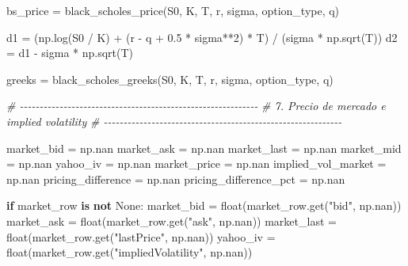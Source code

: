 \documentclass[
  11pt,
]{article}
\newenvironment{Shaded}{}{}
\newcommand{\BuiltInTok}[1]{\textcolor[rgb]{0.00,0.50,0.00}{#1}}
\newcommand{\CommentTok}[1]{\textcolor[rgb]{0.38,0.63,0.69}{\textit{#1}}}
\newcommand{\ControlFlowTok}[1]{\textcolor[rgb]{0.00,0.44,0.13}{\textbf{#1}}}
\newcommand{\DecValTok}[1]{\textcolor[rgb]{0.25,0.63,0.44}{#1}}
\newcommand{\FloatTok}[1]{\textcolor[rgb]{0.25,0.63,0.44}{#1}}
\newcommand{\KeywordTok}[1]{\textcolor[rgb]{0.00,0.44,0.13}{\textbf{#1}}}
\newcommand{\NormalTok}[1]{#1}
\newcommand{\OperatorTok}[1]{\textcolor[rgb]{0.40,0.40,0.40}{#1}}
\newcommand{\StringTok}[1]{\textcolor[rgb]{0.25,0.44,0.63}{#1}}
\newcommand{\VariableTok}[1]{\textcolor[rgb]{0.10,0.09,0.49}{#1}}
\begin{document}
\begin{Shaded}
\begin{Highlighting}[]
\NormalTok{bs\_price }\OperatorTok{=}\NormalTok{ black\_scholes\_price(S0, K, T, r, sigma, option\_type, q)}

\NormalTok{d1 }\OperatorTok{=}\NormalTok{ (np.log(S0 }\OperatorTok{/}\NormalTok{ K) }\OperatorTok{+}\NormalTok{ (r }\OperatorTok{{-}}\NormalTok{ q }\OperatorTok{+} \FloatTok{0.5} \OperatorTok{*}\NormalTok{ sigma}\OperatorTok{**}\DecValTok{2}\NormalTok{) }\OperatorTok{*}\NormalTok{ T) }\OperatorTok{/}\NormalTok{ (sigma }\OperatorTok{*}\NormalTok{ np.sqrt(T))}
\NormalTok{d2 }\OperatorTok{=}\NormalTok{ d1 }\OperatorTok{{-}}\NormalTok{ sigma }\OperatorTok{*}\NormalTok{ np.sqrt(T)}

\NormalTok{greeks }\OperatorTok{=}\NormalTok{ black\_scholes\_greeks(S0, K, T, r, sigma, option\_type, q)}


\CommentTok{\# {-}{-}{-}{-}{-}{-}{-}{-}{-}{-}{-}{-}{-}{-}{-}{-}{-}{-}{-}{-}{-}{-}{-}{-}{-}{-}{-}{-}{-}{-}{-}{-}{-}{-}{-}{-}{-}{-}{-}{-}{-}{-}{-}{-}{-}{-}{-}{-}{-}{-}{-}{-}{-}{-}{-}{-}{-}{-}{-}{-}}
\CommentTok{\# 7. Precio de mercado e implied volatility}
\CommentTok{\# {-}{-}{-}{-}{-}{-}{-}{-}{-}{-}{-}{-}{-}{-}{-}{-}{-}{-}{-}{-}{-}{-}{-}{-}{-}{-}{-}{-}{-}{-}{-}{-}{-}{-}{-}{-}{-}{-}{-}{-}{-}{-}{-}{-}{-}{-}{-}{-}{-}{-}{-}{-}{-}{-}{-}{-}{-}{-}{-}{-}}

\NormalTok{market\_bid }\OperatorTok{=}\NormalTok{ np.nan}
\NormalTok{market\_ask }\OperatorTok{=}\NormalTok{ np.nan}
\NormalTok{market\_last }\OperatorTok{=}\NormalTok{ np.nan}
\NormalTok{market\_mid }\OperatorTok{=}\NormalTok{ np.nan}
\NormalTok{yahoo\_iv }\OperatorTok{=}\NormalTok{ np.nan}
\NormalTok{market\_price }\OperatorTok{=}\NormalTok{ np.nan}
\NormalTok{implied\_vol\_market }\OperatorTok{=}\NormalTok{ np.nan}
\NormalTok{pricing\_difference }\OperatorTok{=}\NormalTok{ np.nan}
\NormalTok{pricing\_difference\_pct }\OperatorTok{=}\NormalTok{ np.nan}

\ControlFlowTok{if}\NormalTok{ market\_row }\KeywordTok{is} \KeywordTok{not} \VariableTok{None}\NormalTok{:}
\NormalTok{    market\_bid }\OperatorTok{=} \BuiltInTok{float}\NormalTok{(market\_row.get(}\StringTok{"bid"}\NormalTok{, np.nan))}
\NormalTok{    market\_ask }\OperatorTok{=} \BuiltInTok{float}\NormalTok{(market\_row.get(}\StringTok{"ask"}\NormalTok{, np.nan))}
\NormalTok{    market\_last }\OperatorTok{=} \BuiltInTok{float}\NormalTok{(market\_row.get(}\StringTok{"lastPrice"}\NormalTok{, np.nan))}
\NormalTok{    yahoo\_iv }\OperatorTok{=} \BuiltInTok{float}\NormalTok{(market\_row.get(}\StringTok{"impliedVolatility"}\NormalTok{, np.nan))}


\end{Highlighting}
\end{Shaded}
\end{document}
